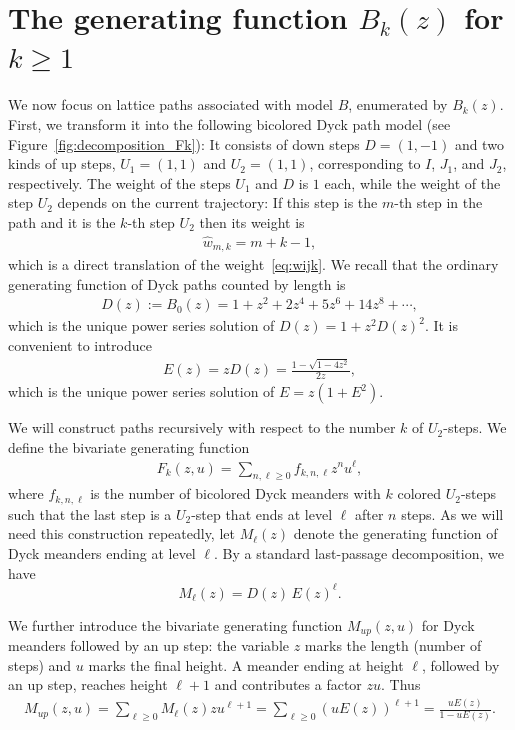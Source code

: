 \documentclass[a4paper,UKenglish,cleveref, autoref, thm-restate]{lipics-v2021}
\begin{document}
\section{The generating function \texorpdfstring{$B_k(z)$}{Bk(z)} for \texorpdfstring{$k\geq 1$}{k>=1}} \label{GF of BK}
\newcommand{\Mup}{M_{up}}

We now focus on lattice paths associated with model $B$, enumerated by $B_k(z)$.
First, we transform it into the following bicolored Dyck path model (see Figure~\ref{fig:decomposition_Fk}): 
It consists of down steps $D = (1,-1)$ and two kinds of up steps, $U_1=(1,1)$ and $U_2=(1,1)$, corresponding to $I$, $J_1$, and $J_2$, respectively.
The weight of the steps $U_1$ and $D$ is $1$ each, while the weight of the step $U_2$ depends on the current trajectory: If this step is the $m$-th step in the path and it is the $k$-th step $U_2$ then its weight is 
\begin{align*}
    \hat{w}_{m,k} = m+k-1,
\end{align*}
which is a direct translation of the weight~\eqref{eq:wijk}.
We recall that the ordinary generating function of Dyck paths counted by length is
\begin{align*}
D(z):=B_0(z)=1+z^2+2z^4+5z^6+14z^8+\cdots,
\end{align*}
which is the unique power series solution of $D(z)=1+z^2D(z)^2$.
It is convenient to introduce
\begin{align} \label{eq:EshorthandDyck} 
E(z) = z D(z) = \frac{1-\sqrt{1-4z^2}}{2z}, \end{align} 
which is the unique power series solution of $E = z(1+E^2)$.

We will construct paths recursively with respect to the number $k$ of $U_2$-steps. 
We define the bivariate generating function 
\begin{align*}
    F_k(z,u) = \sum_{n,\ell \geq 0} f_{k,n,\ell} z^n u^{\ell},
\end{align*}
where $f_{k,n,\ell}$ is the number of bicolored Dyck meanders with $k$ colored $U_2$-steps such that the last step is a $U_2$-step that ends at level $\ell$ after $n$ steps.
As we will need this construction repeatedly, let $M_{\ell}(z)$ denote the generating function of Dyck meanders ending at level $\ell$.
By a standard last-passage decomposition, we have
\[
M_{\ell}(z)=D(z)\,E(z)^{\ell}.
\]

We further introduce the bivariate generating function $\Mup(z,u)$ for Dyck meanders
followed by an up step: the variable $z$ marks the length (number of steps) and
$u$ marks the final height. A meander ending at height $\ell$, followed by an up step, reaches height $\ell+1$ and contributes a factor $zu$.
Thus
\begin{align*}
    \Mup(z,u) 
        = \sum_{\ell \geq 0} M_{\ell}(z) z u^{\ell+1}
        = \sum_{\ell \geq 0} (uE(z))^{\ell+1}
        = \frac{uE(z)}{1-uE(z)}.
\end{align*}
\end{document}
